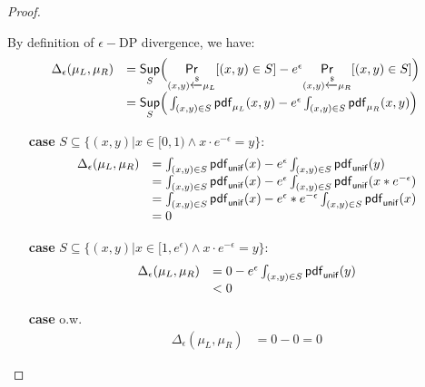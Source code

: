 \documentclass[a4paper,11pt]{article}
\begin{document}
\begin{proof}
\begin{enumerate}
	By definition of $\epsilon-$DP divergence, we have:
	 \[
	 \begin{array}{ll}
	 \Delta_{\epsilon}(\mu_L, \mu_R) 
	 & = \underset{S}{\mathsf{Sup}}
	 \Big(
	 \underset{(x,y) \xleftarrow{\$} \mu_L}{\mathsf{Pr}}[(x,y) \in S] - e^{\epsilon} \underset{(x,y) \xleftarrow{\$} \mu_R}{\mathsf{Pr}}[(x,y) \in S]
	 \Big) \\
	 & =\underset{S}{\mathsf{Sup}}
	 \Big(
	 \int_{(x,y) \in S} \mathsf{pdf}_{\mu_L}(x, y) - e^{\epsilon} \int_{(x,y) \in S} \mathsf{pdf}_{\mu_R}(x, y)
	 \Big)	 
	 \end{array}
	 \]
	 \begin{itemize}
	 	\item[{\bf case}] $S \subseteq \{(x, y) | x \in [0, 1) \land x \cdot e^{-\epsilon} = y\}$:\\
		 \[
		 \begin{array}{ll}
		 \Delta_{\epsilon}(\mu_L, \mu_R) 
		 & = 
		 \int_{(x,y) \in S} \mathsf{pdf}_{\mathsf{unif}}(x) - e^{\epsilon} \int_{(x,y) \in S} \mathsf{pdf}_{\mathsf{unif}}(y)\\
		 & = 
		 \int_{(x,y) \in S} \mathsf{pdf}_{\mathsf{unif}}(x) - e^{\epsilon} \int_{(x,y) \in S} \mathsf{pdf}_{\mathsf{unif}}(x * e^{-\epsilon})\\ 
		 & = 
		 \int_{(x,y) \in S} \mathsf{pdf}_{\mathsf{unif}}(x) - e^{\epsilon}* e^{-\epsilon} \int_{(x,y) \in S} \mathsf{pdf}_{\mathsf{unif}}(x )\\
		 & = 0 
		 \end{array}
		 \]
	 	\item[{\bf case}] $S \subseteq \{(x, y) | x \in [1, e^{\epsilon}) \land x \cdot e^{-\epsilon} = y\}$:\\
		 \[
		 \begin{array}{ll}
		 \Delta_{\epsilon}(\mu_L, \mu_R) 
		 & = 
		 0 - e^{\epsilon} \int_{(x,y) \in S} \mathsf{pdf}_{\mathsf{unif}}(y)\\
		 & <  0 
		 \end{array}
		 \]
	 	\item[{\bf case}] o.w.\\
		 \[
		 \begin{array}{ll}
		 \Delta_{\epsilon}(\mu_L, \mu_R) 
		 & = 0 - 0 =  0 
		 \end{array}
		 \]	 	
	 \end{itemize}

\end{enumerate}
\end{proof}
\end{document}
